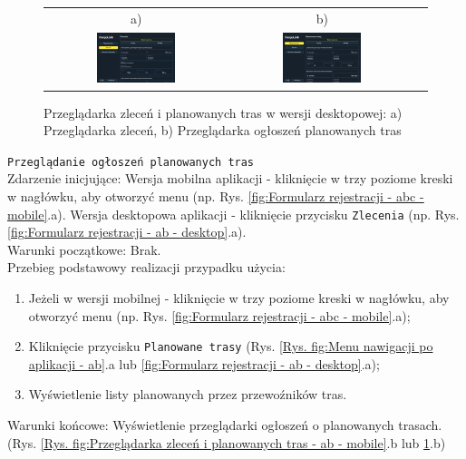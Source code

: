 \begin{figure}[H]
 \centering
  \begin{tabular}{@{}ccc@{}}
  a) & b)\\
  \includegraphics[width=0.45\textwidth]{rozdzial1/zlecenia_d.jpg} &
  \includegraphics[width=0.45\textwidth]{rozdzial1/planowane_trasy_d.jpg}
  \end{tabular}
 \caption{Przeglądarka zleceń i planowanych tras w wersji desktopowej: a) Przeglądarka zleceń, b) Przeglądarka ogłoszeń planowanych tras}
 \label{Rys. fig:Przeglądarka zleceń i planowanych tras - ab - desktop}
\end{figure}

\label{Przeglądanie ogłoszeń planowanych tras}
\texttt{Przeglądanie ogłoszeń planowanych tras} \\
Zdarzenie inicjujące: Wersja mobilna aplikacji - kliknięcie w trzy poziome kreski w nagłówku, aby otworzyć menu (np. Rys. \ref{fig:Formularz rejestracji - abc - mobile}.a). Wersja desktopowa aplikacji - kliknięcie przycisku \texttt{Zlecenia} (np. Rys. \ref{fig:Formularz rejestracji - ab - desktop}.a). \\
Warunki początkowe: Brak. \\
Przebieg podstawowy realizacji przypadku użycia:
\begin{enumerate}
    \item Jeżeli w wersji mobilnej - kliknięcie w trzy poziome kreski w nagłówku, aby otworzyć menu (np. Rys. \ref{fig:Formularz rejestracji - abc - mobile}.a);
    \item Kliknięcie przycisku \texttt{Planowane trasy} (Rys. \ref{Rys. fig:Menu nawigacji po aplikacji - ab}.a lub \ref{fig:Formularz rejestracji - ab - desktop}.a);
    \item Wyświetlenie listy planowanych przez przewoźników tras.
\end{enumerate}
Warunki końcowe: Wyświetlenie przeglądarki ogłoszeń o planowanych trasach. (Rys. \ref{Rys. fig:Przeglądarka zleceń i planowanych tras - ab - mobile}.b lub \ref{Rys. fig:Przeglądarka zleceń i planowanych tras - ab - desktop}.b)\\

